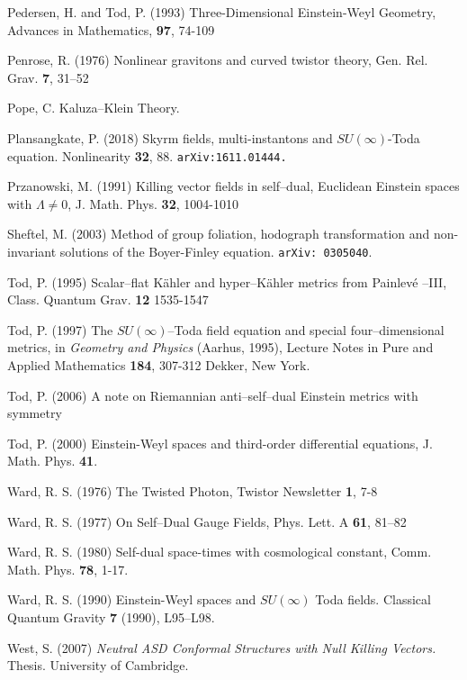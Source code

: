 \begin{thebibliography}{}
 Pedersen, H. and Tod, P. (1993)
Three-Dimensional Einstein-Weyl Geometry,
Advances in Mathematics, {\bf 97}, 74-109


 Penrose, R. (1976) Nonlinear 
gravitons and curved twistor theory, Gen. Rel. Grav.  {\bf 7},  31--52

 Pope, C. Kaluza--Klein Theory.

 Plansangkate, P. (2018)
Skyrm fields, multi-instantons and $SU(\infty)$-Toda equation.
Nonlinearity {\bf 32}, 88.
{\tt arXiv:1611.01444.}

 Przanowski, M. (1991)
Killing vector fields in self--dual, Euclidean Einstein spaces with $\Lambda\neq 0$,
J. Math. Phys. {\bf 32}, 1004-1010

 Sheftel, M. (2003)
Method of group foliation, hodograph transformation and non-invariant solutions of the Boyer-Finley equation.
{\tt arXiv: 0305040}.

 Tod, P. (1995)
Scalar--flat K\"ahler and hyper--K\"ahler metrics from Painlev\'e --III,
Class. Quantum Grav. {\bf 12} 1535-1547

 Tod, P. (1997)
The $SU(\infty)$--Toda field equation and special four--dimensional metrics,
in {\em Geometry and Physics} (Aarhus, 1995), Lecture Notes in Pure and Applied Mathematics {\bf 184}, 307-312 Dekker, New York.

 Tod, P. (2006) {A note on Riemannian anti--self--dual Einstein metrics with symmetry}

 Tod, P. (2000) {Einstein-Weyl spaces and third-order differential equations}, J. Math. Phys. {\bf 41}.



 Ward, R. S. (1976)
The Twisted Photon,
Twistor Newsletter {\bf 1}, 7-8

 Ward, R. S. (1977)
On Self--Dual Gauge Fields,
Phys. Lett. A {\bf 61}, 81--82

   Ward, R. S. (1980)
Self-dual space-times with cosmological constant,
Comm. Math. Phys. {\bf 78},  1-17.

 Ward, R. S. (1990) Einstein-Weyl spaces and 
$SU(\infty)$ Toda fields. Classical Quantum Gravity {\bf 7} (1990), L95–L98.


 West, S. (2007) {\em Neutral ASD Conformal Structures with Null Killing Vectors.} Thesis. University of Cambridge.


\end{thebibliography}
